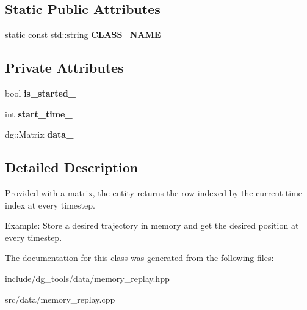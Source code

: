 \subsection*{Static Public Attributes}
\begin{DoxyCompactItemize}
\item 
static const std\+::string {\bfseries C\+L\+A\+S\+S\+\_\+\+N\+A\+ME}\hypertarget{classdg__tools_1_1MemoryReplay_a99b1ae11beccebec65c26e38b670366e}{}\label{classdg__tools_1_1MemoryReplay_a99b1ae11beccebec65c26e38b670366e}

\end{DoxyCompactItemize}
\subsection*{Private Attributes}
\begin{DoxyCompactItemize}
\item 
bool {\bfseries is\+\_\+started\+\_\+}\hypertarget{classdg__tools_1_1MemoryReplay_a878349c497242a2dbe9ef0314fc22cf7}{}\label{classdg__tools_1_1MemoryReplay_a878349c497242a2dbe9ef0314fc22cf7}

\item 
int {\bfseries start\+\_\+time\+\_\+}\hypertarget{classdg__tools_1_1MemoryReplay_a7d1394b959e16997e30ee1b5f92776d3}{}\label{classdg__tools_1_1MemoryReplay_a7d1394b959e16997e30ee1b5f92776d3}

\item 
dg\+::\+Matrix {\bfseries data\+\_\+}\hypertarget{classdg__tools_1_1MemoryReplay_a690c7a438233ac381cbfafb0fb0a93da}{}\label{classdg__tools_1_1MemoryReplay_a690c7a438233ac381cbfafb0fb0a93da}

\end{DoxyCompactItemize}


\subsection{Detailed Description}
Provided with a matrix, the entity returns the row indexed by the current time index at every timestep. 

Example\+: Store a desired trajectory in memory and get the desired position at every timestep. 

The documentation for this class was generated from the following files\+:\begin{DoxyCompactItemize}
\item 
include/dg\+\_\+tools/data/memory\+\_\+replay.\+hpp\item 
src/data/memory\+\_\+replay.\+cpp\end{DoxyCompactItemize}
